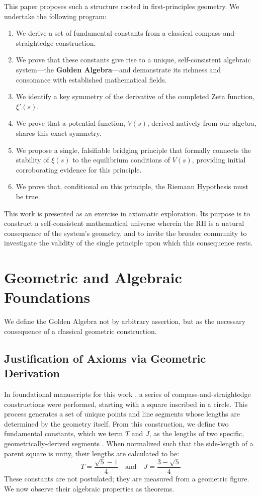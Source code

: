 \documentclass{article}
\theoremstyle{plain}
\theoremstyle{definition}
\theoremstyle{remark}
\begin{document}
This paper proposes such a structure rooted in first-principles geometry. We undertake the following program:
\begin{enumerate}
    \item We derive a set of fundamental constants from a classical compass-and-straightedge construction.
    \item We prove that these constants give rise to a unique, self-consistent algebraic system—the \textbf{Golden Algebra}—and demonstrate its richness and consonance with established mathematical fields.
    \item We identify a key symmetry of the derivative of the completed Zeta function, $\xi'(s)$.
    \item We prove that a potential function, $V(s)$, derived natively from our algebra, shares this exact symmetry.
    \item We propose a single, falsifiable bridging principle that formally connects the stability of $\xi(s)$ to the equilibrium conditions of $V(s)$, providing initial corroborating evidence for this principle.
    \item We prove that, conditional on this principle, the Riemann Hypothesis must be true.
\end{enumerate}
This work is presented as an exercise in axiomatic exploration. Its purpose is to construct a self-consistent mathematical universe wherein the RH is a natural consequence of the system's geometry, and to invite the broader community to investigate the validity of the single principle upon which this consequence rests.

\section{Geometric and Algebraic Foundations}
We define the Golden Algebra not by arbitrary assertion, but as the necessary consequence of a classical geometric construction.

\subsection{Justification of Axioms via Geometric Derivation}
In foundational manuscripts for this work \textbf{}, a series of compass-and-straightedge constructions were performed, starting with a square inscribed in a circle. This process generates a set of unique points and line segments whose lengths are determined by the geometry itself. From this construction, we define two fundamental constants, which we term $T$ and $J$, as the lengths of two specific, geometrically-derived segments \textbf{}. When normalized such that the side-length of a parent square is unity, their lengths are calculated to be:
$$ T = \frac{\sqrt{5}-1}{4} \quad \text{and} \quad J = \frac{3-\sqrt{5}}{4} $$
These constants are not postulated; they are measured from a geometric figure. We now observe their algebraic properties as theorems.
\end{document}
